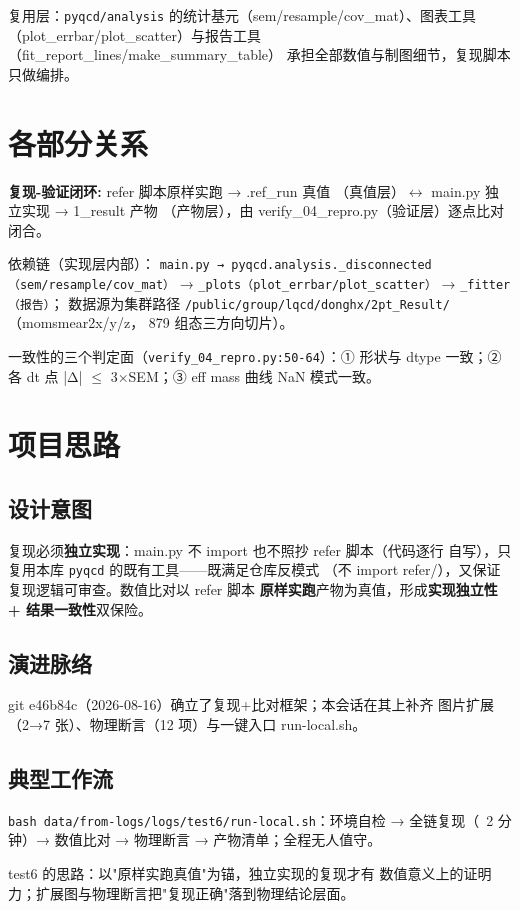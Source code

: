 \documentclass[UTF8]{ctexart}
\begin{document}
复用层：\texttt{pyqcd/analysis} 的统计基元（sem/resample/cov\_mat）、图表工具
（plot\_errbar/plot\_scatter）与报告工具（fit\_report\_lines/make\_summary\_table）
承担全部数值与制图细节，复现脚本只做编排。

\section{各部分关系}
\begin{keybox}
\textbf{复现-验证闭环:} \textcolor{relation}{refer 脚本原样实跑 → .ref\_run 真值}
（真值层）$\leftrightarrow$ \textcolor{relation}{main.py 独立实现 → 1\_result 产物}
（产物层），由 \textcolor{relation}{verify\_04\_repro.py}（验证层）逐点比对闭合。
\end{keybox}

依赖链（实现层内部）：
\texttt{main.py → pyqcd.analysis.\_disconnected（sem/resample/cov\_mat）}
→ \texttt{\_plots（plot\_errbar/plot\_scatter）} → \texttt{\_fitter（报告）}；
数据源为集群路径 \texttt{/public/group/lqcd/donghx/2pt\_Result/}（momsmear2x/y/z，
879 组态三方向切片）。

一致性的三个判定面（\texttt{verify\_04\_repro.py:50-64}）：① 形状与 dtype
一致；② 各 dt 点 |Δ| $\le$ 3$\times$SEM；③ eff mass 曲线 NaN 模式一致。

\section{项目思路}
\subsection{设计意图}
复现必须\textbf{独立实现}：main.py 不 import 也不照抄 refer 脚本（代码逐行
自写），只复用本库 \texttt{pyqcd} 的既有工具——既满足仓库反模式
（不 import refer/），又保证复现逻辑可审查。数值比对以 refer 脚本
\textbf{原样实跑}产物为真值，形成\textbf{实现独立性 + 结果一致性}双保险。
\subsection{演进脉络}
git e46b84c（2026-08-16）确立了复现+比对框架；本会话在其上补齐
图片扩展（2→7 张）、物理断言（12 项）与一键入口 run-local.sh。
\subsection{典型工作流}
\texttt{bash data/from-logs/logs/test6/run-local.sh}：环境自检 → 全链复现（~2 分钟）→
数值比对 → 物理断言 → 产物清单；全程无人值守。
\begin{ideabox}
\textcolor{idea}{test6 的思路：以"原样实跑真值"为锚，独立实现的复现才有
  数值意义上的证明力；扩展图与物理断言把"复现正确"落到物理结论层面。}
\end{ideabox}
\end{document}
